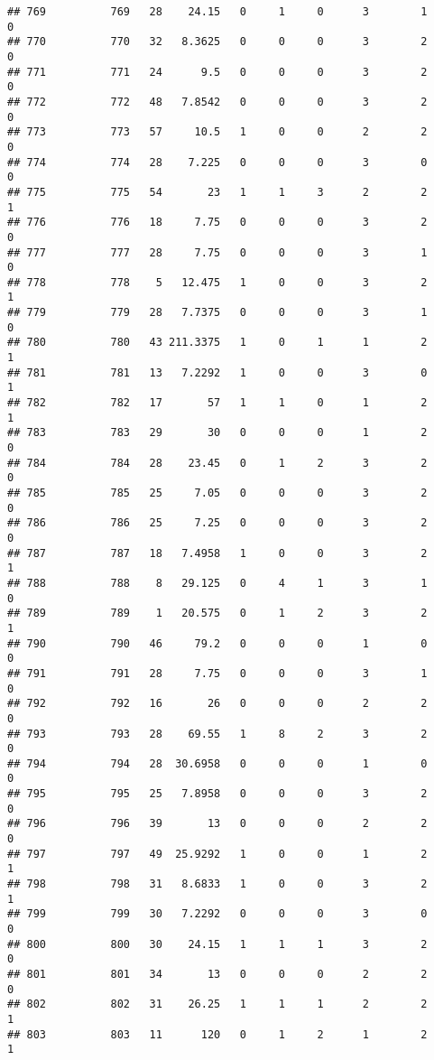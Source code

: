 \documentclass[
]{article}
\begin{document}
\begin{verbatim}
## 769          769   28    24.15   0     1     0      3        1         0
## 770          770   32   8.3625   0     0     0      3        2         0
## 771          771   24      9.5   0     0     0      3        2         0
## 772          772   48   7.8542   0     0     0      3        2         0
## 773          773   57     10.5   1     0     0      2        2         0
## 774          774   28    7.225   0     0     0      3        0         0
## 775          775   54       23   1     1     3      2        2         1
## 776          776   18     7.75   0     0     0      3        2         0
## 777          777   28     7.75   0     0     0      3        1         0
## 778          778    5   12.475   1     0     0      3        2         1
## 779          779   28   7.7375   0     0     0      3        1         0
## 780          780   43 211.3375   1     0     1      1        2         1
## 781          781   13   7.2292   1     0     0      3        0         1
## 782          782   17       57   1     1     0      1        2         1
## 783          783   29       30   0     0     0      1        2         0
## 784          784   28    23.45   0     1     2      3        2         0
## 785          785   25     7.05   0     0     0      3        2         0
## 786          786   25     7.25   0     0     0      3        2         0
## 787          787   18   7.4958   1     0     0      3        2         1
## 788          788    8   29.125   0     4     1      3        1         0
## 789          789    1   20.575   0     1     2      3        2         1
## 790          790   46     79.2   0     0     0      1        0         0
## 791          791   28     7.75   0     0     0      3        1         0
## 792          792   16       26   0     0     0      2        2         0
## 793          793   28    69.55   1     8     2      3        2         0
## 794          794   28  30.6958   0     0     0      1        0         0
## 795          795   25   7.8958   0     0     0      3        2         0
## 796          796   39       13   0     0     0      2        2         0
## 797          797   49  25.9292   1     0     0      1        2         1
## 798          798   31   8.6833   1     0     0      3        2         1
## 799          799   30   7.2292   0     0     0      3        0         0
## 800          800   30    24.15   1     1     1      3        2         0
## 801          801   34       13   0     0     0      2        2         0
## 802          802   31    26.25   1     1     1      2        2         1
## 803          803   11      120   0     1     2      1        2         1

\end{verbatim}
\end{document}
